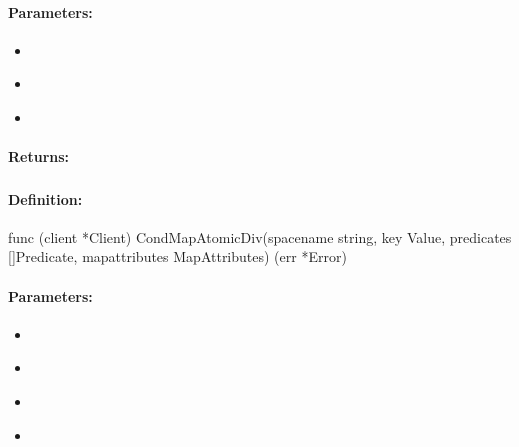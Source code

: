 \paragraph{Parameters:}
\begin{itemize}[noitemsep]
\item {}\\

\item {}\\

\item {}\\

\end{itemize}

\paragraph{Returns:}


\pagebreak
\subsubsection{}
\label{api:Go:CondMapAtomicDiv}


\paragraph{Definition:}
\begin{gocode}
func (client *Client) CondMapAtomicDiv(spacename string, key Value, predicates []Predicate, mapattributes MapAttributes) (err *Error)
\end{gocode}

\paragraph{Parameters:}
\begin{itemize}[noitemsep]
\item {}\\

\item {}\\

\item {}\\

\item {}\\

\end{itemize}

